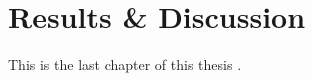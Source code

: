 %
\section{Results \& Discussion}\label{sec:Results & Discussion}
%
This is the last chapter of this thesis \cite{tur38}.
%
